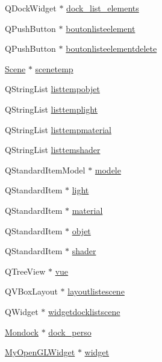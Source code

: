 \begin{DoxyCompactItemize}
Q\+Dock\+Widget $\ast$ \hyperlink{class_main_window_ab0e654c3c8f22ae05433da58c112f155}{dock\+\_\+list\+\_\+elements}
\item 
Q\+Push\+Button $\ast$ \hyperlink{class_main_window_af87ab6bb1e48500cc732286cc98b990e}{boutonlisteelement}
\item 
Q\+Push\+Button $\ast$ \hyperlink{class_main_window_a0300f02a442c333e918e229817b27ef2}{boutonlisteelementdelete}
\item 
\hyperlink{class_scene}{Scene} $\ast$ \hyperlink{class_main_window_ab3b59f5d30eaedb1281da2b817c17fdf}{scenetemp}
\item 
Q\+String\+List \hyperlink{class_main_window_aefc66839b56eea01fa7b8b49ab5182a7}{listtempobjet}
\item 
Q\+String\+List \hyperlink{class_main_window_a2da91caa3f9e740cb7a50e110516212e}{listtemplight}
\item 
Q\+String\+List \hyperlink{class_main_window_a6eb445b9be6c49cf139c74b356ef7e58}{listtempmaterial}
\item 
Q\+String\+List \hyperlink{class_main_window_a889162c5299f284129bec68a0cc45cbf}{listtemshader}
\item 
Q\+Standard\+Item\+Model $\ast$ \hyperlink{class_main_window_abb752b382e336483740c8e0ad21cbcf5}{modele}
\item 
Q\+Standard\+Item $\ast$ \hyperlink{class_main_window_a36a5d988881c1ce38d0692ed500067e1}{light}
\item 
Q\+Standard\+Item $\ast$ \hyperlink{class_main_window_ad89e3c0f75025021cddb58c4cdd5edd8}{material}
\item 
Q\+Standard\+Item $\ast$ \hyperlink{class_main_window_ac76a7b94394a43600a0719ce4af388fc}{objet}
\item 
Q\+Standard\+Item $\ast$ \hyperlink{class_main_window_a8e49ee04eabb719ac4be13ba8cd3fe38}{shader}
\item 
Q\+Tree\+View $\ast$ \hyperlink{class_main_window_ac0150259862bd3b40a76b35a00b9e97a}{vue}
\item 
Q\+V\+Box\+Layout $\ast$ \hyperlink{class_main_window_ab25fb184d802450a71a998cf113d481a}{layoutlistescene}
\item 
Q\+Widget $\ast$ \hyperlink{class_main_window_a38d553a96a3898e65b500c639673b8de}{widgetdocklistscene}
\item 
\hyperlink{class_mondock}{Mondock} $\ast$ \hyperlink{class_main_window_a0733647a631eeb38fc72d3cf7e01c3db}{dock\+\_\+perso}
\item 
\hyperlink{class_my_open_g_l_widget}{My\+Open\+G\+L\+Widget} $\ast$ \hyperlink{class_main_window_a0a21ff789dee5a19a74d2461cf0820dc}{widget}
\end{DoxyCompactItemize}


